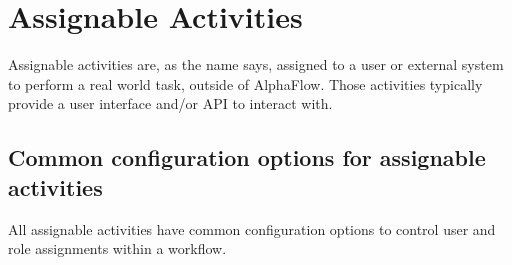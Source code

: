 \section{Assignable Activities}

  Assignable activities are, as the name says, assigned to a user or external
  system to perform a real world task, outside of AlphaFlow. Those activities
  typically provide a user interface and/or API to interact with.

  \subsection{Common configuration options for assignable activities}

  All assignable activities have common configuration options to control
  user and role assignments within a workflow.
    

